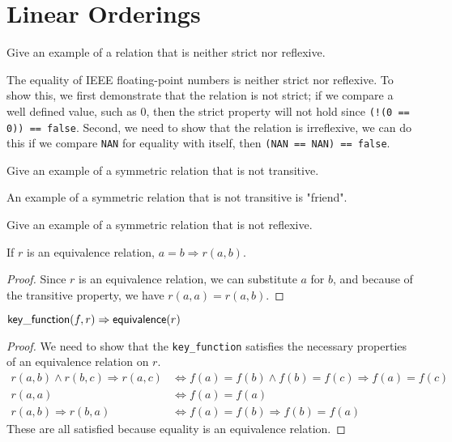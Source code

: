 \chapter{Linear Orderings}

\begin{exercise}
	Give an example of a relation that is neither strict nor reflexive.
\end{exercise}

\begin{solution}
	The equality of IEEE floating-point numbers is neither strict nor reflexive. To show this, we first
	demonstrate that the relation is not strict; if we compare a well defined value, such as 0, then
	the strict property will not hold since \verb|(!(0 == 0)) == false|. Second, we need to show that
	the relation is irreflexive, we can do this if we compare \verb|NAN| for equality with itself, then
	\verb|(NAN == NAN) == false|.

	
\end{solution}

\begin{exercise}
	Give an example of a symmetric relation that is not transitive.
\end{exercise}

\begin{solution}
	An example of a symmetric relation that is not transitive is "friend".
\end{solution}

\begin{exercise}
	Give an example of a symmetric relation that is not reflexive.
\end{exercise}

\begin{lemma}
	If $r$ is an equivalence relation, $a = b \Rightarrow r(a, b)$.
\end{lemma}

\begin{proof}
	Since $r$ is an equivalence relation, we can substitute $a$ for $b$, and
	because of the transitive property, we have $r(a, a) = r(a, b)$.
\end{proof}

\begin{lemma}
	$\mathsf{key\_function}(f, r) \Rightarrow \mathsf{equivalence}(r)$
\end{lemma}

\begin{proof}
	We need to show that the \verb|key_function| satisfies the necessary properties
	of an equivalence relation on $r$.
	\begin{align*}
		r(a, b) \wedge r(b, c) \Rightarrow r(a, c)
		&\Leftrightarrow f(a) = f(b) \wedge f(b) = f(c) \Rightarrow f(a) = f(c)\\
		r(a, a)
		&\Leftrightarrow f(a) = f(a)\\
		r(a, b) \Rightarrow r(b, a)
		&\Leftrightarrow f(a) = f(b) \Rightarrow f(b) = f(a)
	\end{align*}
	These are all satisfied because equality is an equivalence relation.
\end{proof}

